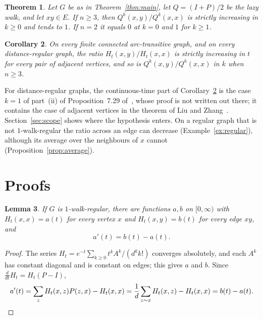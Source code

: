 \documentclass[11pt]{amsart}
\newtheorem{theorem}{Theorem}[section]
\newtheorem{lemma}[theorem]{Lemma}
\newtheorem{corollary}[theorem]{Corollary}
\theoremstyle{definition}
\theoremstyle{remark}
\begin{document}
\begin{theorem}\label{thm:lazy}
Let $G$ be as in Theorem~\ref{thm:main}, let $Q=(I+P)/2$ be the lazy walk, and let $xy\in E$. If $n\ge3$, then $Q^k(x,y)/Q^k(x,x)$ is strictly increasing in $k\ge0$ and tends to $1$. If $n=2$ it equals $0$ at $k=0$ and $1$ for $k\ge1$.
\end{theorem}

\begin{corollary}\label{cor:arc}
On every finite connected arc-transitive graph, and on every distance-regular graph, the ratio $H_t(x,y)/H_t(x,x)$ is strictly increasing in $t$ for every pair of adjacent vertices, and so is $Q^k(x,y)/Q^k(x,x)$ in $k$ when $n\ge3$.
\end{corollary}

For distance-regular graphs, the continuous-time part of Corollary~\ref{cor:arc} is the case $k=1$ of part~(ii) of Proposition~7.29 of~\cite{AF}, whose proof is not written out there; it contains the case of adjacent vertices in the theorem of Liu and Zhang~\cite[Theorem~1]{LZ}. Section~\ref{sec:scope} shows where the hypothesis enters. On a regular graph that is not $1$-walk-regular the ratio across an edge can decrease (Example~\ref{ex:regular}), although its average over the neighbours of $x$ cannot (Proposition~\ref{prop:average}).

\section{Proofs}

\begin{lemma}\label{lem:constant}
If $G$ is $1$-walk-regular, there are functions $a,b$ on $[0,\infty)$ with $H_t(x,x)=a(t)$ for every vertex $x$ and $H_t(x,y)=b(t)$ for every edge $xy$, and
\[
a'(t)=b(t)-a(t).
\]
\end{lemma}

\begin{proof}
The series $H_t=e^{-t}\sum_{k\ge0}t^kA^k/(d^kk!)$ converges absolutely, and each $A^k$ has constant diagonal and is constant on edges; this gives $a$ and $b$. Since $\frac{d}{dt}H_t=H_t(P-I)$,
\[
a'(t)=\sum_{z}H_t(x,z)P(z,x)-H_t(x,x)=\frac1d\sum_{z\sim x}H_t(x,z)-H_t(x,x)=b(t)-a(t). \qedhere
\]
\end{proof}
\end{document}
